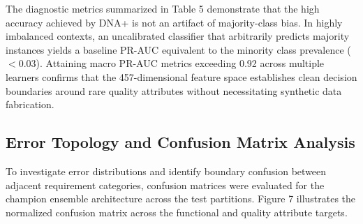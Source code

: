 \begin{table}[htbp]
\centering
\caption{Diagnostic discrimination calibration across eight representative classification architectures, contrasting ROC-AUC with precision-recall dynamics under severe class skew~\cite{ref17,ref20}.}
\label{tab:roc_prc_calibration}
\small
{}
\end{table}

The diagnostic metrics summarized in Table 5 demonstrate that the high accuracy achieved by DNA+ is not an artifact of majority-class bias. In highly imbalanced contexts, an uncalibrated classifier that arbitrarily predicts majority instances yields a baseline PR-AUC equivalent to the minority class prevalence ($<0.03$). Attaining macro PR-AUC metrics exceeding 0.92 across multiple learners confirms that the 457-dimensional feature space establishes clean decision boundaries around rare quality attributes without necessitating synthetic data fabrication.

\subsection{Error Topology and Confusion Matrix Analysis}
To investigate error distributions and identify boundary confusion between adjacent requirement categories, confusion matrices were evaluated for the champion ensemble architecture across the test partitions. Figure 7 illustrates the normalized confusion matrix across the functional and quality attribute targets.

